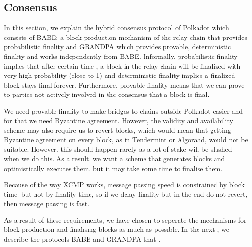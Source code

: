 \subsection{Consensus}\label{sec:consensus}

In this section, we explain the hybrid consensus protocol of Polkadot which consists of BABE: a block production mechanism of the relay chain that provides probabilistic finality and GRANDPA which provides provable, deterministic finality and works independently from BABE.  Informally, probabilistic finality implies that after certain time , a block in the relay chain will be finalized with very high probability (close to 1) and deterministic finality implies a finalized block stays final forever. Furthermore, provable finality means that  we can prove to parties not actively involved in the consensus that a block is final.

We need provable finality to make bridges to chains outside Polkadot easier and for that we need Byzantine agreement. However, the validity and availability scheme may also require us to revert blocks, which would mean that getting Byzantine agreement on every block, as in Tendermint or Algorand, would not be suitable. However, this should happen rarely as a lot of stake will be slashed when we do this. As a result, we want a scheme that generates blocks and optimistically executes them, but it may take some time to finalise them. 

Because of the way XCMP works, message passing speed is constrained by block time, but not by finality time, so if we delay finality but in the end do not revert, then message passing is fast.

As a result of these requirements, we have chosen to seperate the mechanisms for block production and finalising blocks as much as possible. In the next , we describe the protocols BABE and GRANDPA that .




